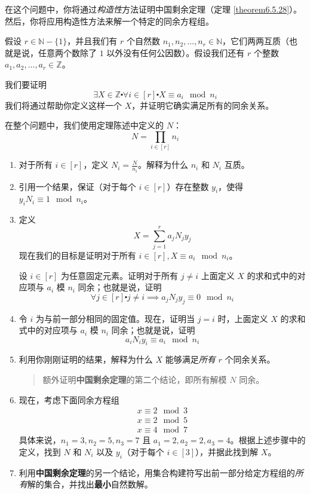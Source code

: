 \begin{exercise}\label{exc:exercises6.7.27}
    在这个问题中，你将通过\emph{构造性}方法证明中国剩余定理（定理 \ref{theorem6.5.28}）。然后，你将应用构造性方法来解一个特定的同余方程组。

    假设 $r \in \mathbb{N} - \{1\}$，并且我们有 $r$ 个自然数 $n_1, n_2, \dots , n_r \in \mathbb{N}$，它们两两互质（也就是说，任意两个数除了 $1$ 以外没有任何公因数）。假设我们还有 $r$ 个整数 $a_1, a_2, \dots , a_r \in \mathbb{Z}$。

    我们要证明
    \[\exists X \in \mathbb{Z} \centerdot \forall i \in [r] \centerdot X \equiv a_i \mod n_i\]
    我们将通过帮助你定义这样一个 $X$，并证明它确实满足所有的同余关系。

    在整个问题中，我们使用定理陈述中定义的 $N$：
    \[N = \prod_{i \in [r]} n_i\]
    \begin{enumerate}[label=(\alph*)]
        \item 对于所有 $i \in [r]$，定义 $N_i = \frac{N}{n_i}$。解释为什么 $n_i$ 和 $N_i$ 互质。
        \item 引用一个结果，保证（对于每个 $i \in [r]$）存在整数 $y_i$，使得 $y_iN_i \equiv 1 \mod n_i$。
        \item 定义
            \[X = \sum_{j=1}^{r} a_jN_jy_j\]
            现在我们的目标是证明对于所有 $i \in [r], X \equiv a_i \mod n_i$。

            设 $i \in [r]$ 为任意固定元素。证明对于所有 $j \ne i$ 上面定义 $X$ 的求和式中的对应项与 $a_i$ 模 $n_i$ 同余；也就是说，证明
            \[\forall j \in [r] \centerdot j \ne i \implies a_jN_jy_j \equiv 0 \mod n_i\]
        \item 令 $i$ 为与前一部分相同的固定值。现在，证明当 $j = i$ 时，上面定义 $X$ 的求和式中的对应项与 $a_i$ 模 $n_i$ 同余；也就是说，证明
            \[a_iN_iy_i \equiv a_i \mod n_i\]
        \item 利用你刚刚证明的结果，解释为什么 $X$ 能够满足\emph{所有} $r$ 个同余关系。
        
        \begin{quote}
            额外证明\textbf{中国剩余定理}的第二个结论，即所有解模 $N$ 同余。
        \end{quote}

        \item 现在，考虑下面同余方程组
            \begin{align*}
                x \equiv 2 \mod 3 \\
                x \equiv 2 \mod 5 \\
                x \equiv 4 \mod 7
            \end{align*}
            具体来说，$n_1 = 3, n_2 = 5, n_3 = 7$ 且 $a_1 = 2, a_2 = 2, a_3 = 4$。根据上述步骤中的定义，找到 $N$ 和 $N_i$ 以及 $y_i$（对于每个 $i \in [3]$），并据此找到解 $X$。
        \item 利用\textbf{中国剩余定理}的另一个结论，用集合构建符写出前一部分给定方程组的\emph{所有}解的集合，并找出\textbf{最小}自然数解。
    \end{enumerate}
\end{exercise}


